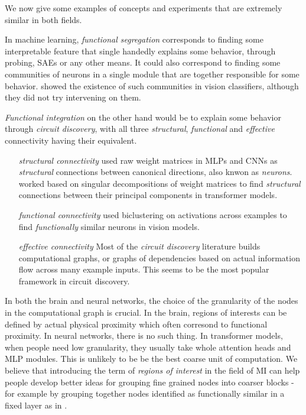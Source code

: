 \documentclass{article}
\begin{document}
We now give some examples of concepts and experiments that are extremely similar in both fields.

In machine learning, \textit{functional segregation} corresponds to finding some interpretable feature that single handedly explains some behavior, through probing, SAEs or any other means. It could also correspond to finding some communities of neurons in a single module that are together responsible for some behavior. \citep{TODO} showed the existence of such communities in vision classifiers, although they did not try intervening on them.

\textit{Functional integration} on the other hand would be to explain some behavior through \textit{circuit discovery}, with all three \textit{structural}, \textit{functional} and \textit{effective} connectivity having their equivalent.
\begin{itemize}
    \item[\textit{structural connectivity}] \citep{TODOclusterability} used raw weight matrices in MLPs and CNNs as \textit{structural} connections between canonical directions, also knwon as \textit{neurons}. \citep{merullo2024talking} worked based on singular decompositions of weight matrices to find \textit{structural} connections between their principal components in transformer models.
    \item[\textit{functional connectivity}] \citep{TODOvision} used biclustering on activations across examples to find \textit{functionally} similar neurons in vision models.
    \item[\textit{effective connectivity}] Most of the \textit{circuit discovery} literature builds computational graphs, or graphs of dependencies based on actual information flow across many example inputs. This seems to be the most popular framework in circuit discovery.
\end{itemize}

In both the brain and neural networks, the choice of the granularity of the nodes in the computational graph is crucial. In the brain, regions of interests can be defined by actual physical proximity which often corresond to functional proximity. In neural networks, there is no such thing. In transformer models, when people need low granularity, they usually take whole attention heads and MLP modules. This is unlikely to be be the best coarse unit of computation. We believe that introducing the term of \textit{regions of interest} in the field of MI can help people develop better ideas for grouping fine grained nodes into coarser blocks - for example by grouping together nodes identified as functionally similar in a fixed layer as in \citep{TODOvision}.
\end{document}
